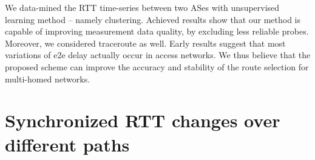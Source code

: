 We data-mined the RTT time-series between two ASes with unsupervised learning method -- namely clustering.
Achieved results show that our method is capable of improving measurement data quality, by excluding less reliable probes.
Moreover, we considered traceroute as well. 
Early results suggest that most variations of e2e delay actually occur in access networks. We thus believe that the proposed scheme can improve the accuracy and stability of the route selection for multi-homed networks.
\section{Synchronized RTT changes over different paths}
\label{sec:ripe_case_study}
